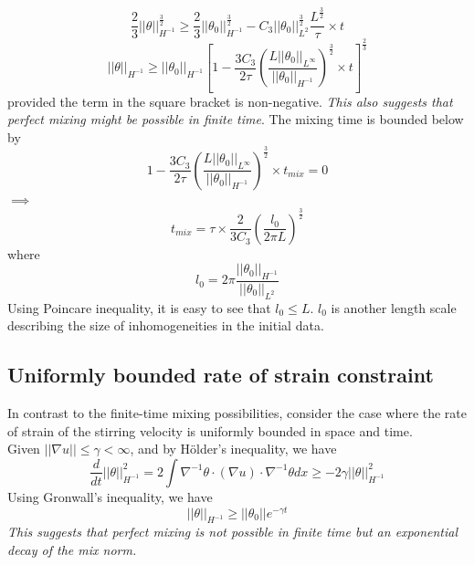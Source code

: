 \documentclass[12pt]{report}   %
\renewcommand{\leq}{\leqslant}
\renewcommand{\geq}{\geqslant}
\numberwithin{equation}{section}
\theoremstyle{plain}
\theoremstyle{definition}
\theoremstyle{remark}
\begin{document}
\[ \frac{2}{3}||\theta||_{H^{-1}}^\frac{3}{2}  \geq \frac{2}{3}||\theta_0||_{H^{-1}}^\frac{3}{2}  - C_3  ||\theta_0||_{L^2}^\frac{3}{2} \frac{L^\frac{3}{2}}{\tau} \times t \]
\begin{equation}
||\theta||_{H^{-1}} \geq ||\theta_0||_{H^{-1}} \left[ 1 - \frac{3C_3}{2\tau}\left(\frac{L||\theta_0||_{L^\infty}}{||\theta_0||_{H^{-1}}} \right)^\frac{3}{2} \times  t  \right]^\frac{2}{3} \label{eq:12}
\end{equation}
provided the term in the square bracket is non-negative. \textit{This also suggests that perfect mixing might be possible in finite time}. The mixing time is bounded below by 
\[ 1 - \frac{3C_3}{2\tau}\left(\frac{L||\theta_0||_{L^\infty}}{||\theta_0||_{H^{-1}}} \right)^\frac{3}{2} \times  t_{mix}  = 0 \]
$\implies$
\begin{equation}
 t_{mix} = \tau \times \frac{2}{3C_3}\left( \frac{l_0}{2\pi L}\right)^\frac{3}{2}  \label{eq:13}
\end{equation}
where \[ l_0 = 2\pi \frac{||\theta_0||_{H^{-1}}}{||\theta_0||_{L^2}}\]
Using Poincare inequality, it is easy to see that $l_0 \leq L$. $l_0$ is another length scale describing  the size of inhomogeneities in the initial data.


\subsection{Uniformly bounded rate of strain constraint}
In contrast to the finite-time mixing possibilities, consider the case where the rate of strain of the stirring velocity is uniformly bounded in space and time. \\
Given $||\nabla u|| \leq \gamma < \infty$, and by H\"{o}lder's inequality, we have
\begin{equation}
\frac{d}{dt} ||\theta||_{H^{-1}}^2 = 2\int \nabla^{-1}\theta \cdot (\nabla u) \cdot \nabla^{-1}\theta dx \geq -2\gamma ||\theta||_{H^{-1}}^2
\end{equation}
Using Gronwall's inequality, we have 
\[ ||\theta||_{H^{-1}} \geq ||\theta_0|| e^{-\gamma t} \]
\textit{This suggests that perfect mixing is not possible in finite time but an exponential decay of the mix norm.}
\end{document}
